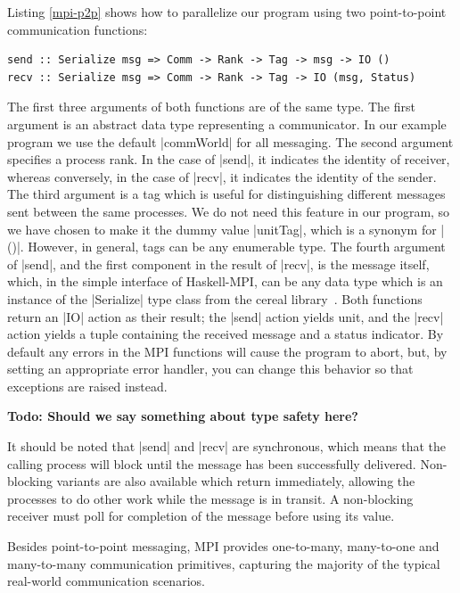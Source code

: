\documentclass{tmr}
\newcommand{\Todo}[1]{{\textbf{Todo: #1}}}
\begin{document}
Listing \ref{mpi-p2p} shows how to parallelize our program using
two point-to-point communication functions:
\begin{Verbatim}
send :: Serialize msg => Comm -> Rank -> Tag -> msg -> IO ()
recv :: Serialize msg => Comm -> Rank -> Tag -> IO (msg, Status)
\end{Verbatim}
The first three arguments of both functions are of the same type.
The first argument is an abstract data
type representing a communicator. In our example program we use
the default |commWorld| for all messaging. The second argument
specifies a process rank. In the case of |send|, it indicates
the identity of receiver, whereas conversely, in the case
of |recv|, it indicates the identity of the sender.
The third argument is a tag which is useful for distinguishing
different messages sent between the same processes.
We do not need this feature in our program, so we have chosen
to make it the dummy value |unitTag|, which is a synonym for |()|.
However, in general, tags can be any enumerable type.
The fourth argument of |send|, and the first component in
the result of |recv|, is the message itself, which,
in the simple interface of Haskell-MPI, can be any
data type which is an instance of the |Serialize| type class
from the cereal library~\cite{cereal}. Both functions return
an |IO| action as their result; the |send| action yields
unit, and the |recv| action yields a tuple containing
the received message and a status indicator.
By default any errors in
the MPI functions will cause the program to abort, but, by
setting an appropriate error handler, you can
change this behavior so that exceptions are raised instead.

\Todo{Should we say something about type safety here?}

It should be noted that |send| and |recv| are synchronous,
which means that the calling process will block until the message has been
successfully delivered. Non-blocking variants are also available which
return immediately, allowing the processes to do other work while
the message is in transit. A non-blocking receiver must poll for
completion of the message before using its value.

Besides point-to-point messaging, MPI
provides one-to-many, many-to-one and many-to-many communication
primitives, capturing the majority of the typical real-world communication
scenarios.
\end{document}
